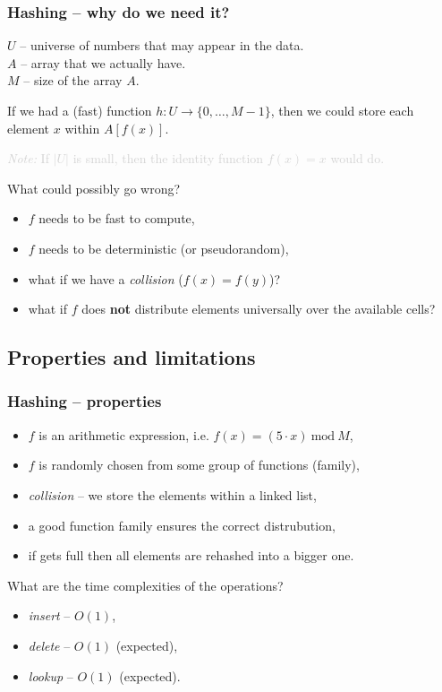 \documentclass{beamer}
\begin{document}
\begin{frame}
    \frametitle{Hashing -- why do we need it?}
    \begin{block}{}
    $U$ -- universe of numbers that may appear in the data. \\
    $A$ -- array that we actually have. \\
    $M$ -- size of the array $A$.
    \end{block}

    \pause
    If we had a (fast) function $h : U \rightarrow \{0, \dots, M-1\}$, then we
    could store each element $x$ within $A[f(x)]$.

    \pause
    \textcolor{lightgray}{
    \textit{Note:} If $|U|$ is small, then the identity function $f(x) = x$
    would do.}

    \pause
    What could possibly go wrong? \pause
    \begin{itemize}
        \item $f$ needs to be fast to compute, \pause
        \item $f$ needs to be deterministic (or pseudorandom), \pause
        \item what if we have a \textit{collision} ($f(x) = f(y)$)? \pause
        \item what if $f$ does \textbf{not} distribute elements universally over
            the available cells?
    \end{itemize}

\end{frame}

\subsection{Properties and limitations}

\begin{frame}
    \frametitle{Hashing -- properties}
    \begin{itemize}
        \item $f$ is an arithmetic expression,
            i.e. $f(x) = (5 \cdot x)\ \mathrm{mod}\ M$, \pause
        \item $f$ is randomly chosen from some group of functions
            (family), \pause
        \item \textit{collision} -- we store the elements
            within a linked list, \pause
        \item a good function family ensures the correct distrubution, \pause
        \item if gets full then all elements are rehashed into
            a bigger one. \pause
    \end{itemize}

    What are the time complexities of the operations?
    \begin{itemize}
        \item \textit{insert} -- \pause $O(1)$, \pause
        \item \textit{delete} -- \pause $O(1)$ (expected), \pause
        \item \textit{lookup} -- \pause $O(1)$ (expected).
    \end{itemize}
\end{frame}
\end{document}
